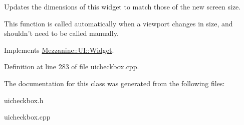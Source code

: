 Updates the dimensions of this widget to match those of the new screen size. 

This function is called automatically when a viewport changes in size, and shouldn't need to be called manually. 

Implements \hyperlink{classMezzanine_1_1UI_1_1Widget_af23f919f2912ac10230953a848c9889c}{Mezzanine::UI::Widget}.



Definition at line 283 of file uicheckbox.cpp.



The documentation for this class was generated from the following files:\begin{DoxyCompactItemize}
\item 
uicheckbox.h\item 
uicheckbox.cpp\end{DoxyCompactItemize}
